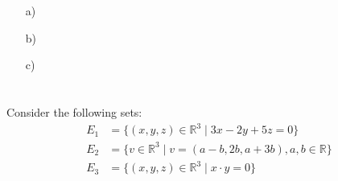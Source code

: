 \documentclass[12pt]{article}
\begin{document}
\begin{correctionbox}                                                                                                                                                                                                                    
\begin{enumerate}                                                                                                                                                                                                                                 
    \item[a)] 
              
    \item[b)] 
              
    \item[c)] 
\end{enumerate}                                                                                                                                                                                                                                    
\end{correctionbox}                                                                                                                                                                                                                      
                                                                                                                                                                                                                                         
\section{}                                                                                                                                                                                                                               
Consider the following sets:
\begin{align*}
E_1 &= \{(x, y, z) \in \mathbb{R}^3 \mid 3x - 2y + 5z = 0\}\\
E_2 &= \{v \in \mathbb{R}^3 \mid v = (a - b, 2b, a + 3b), a, b \in \mathbb{R}\}\\
E_3 &= \{(x, y, z) \in \mathbb{R}^3 \mid x \cdot y = 0\}
\end{align*}
\end{document}

